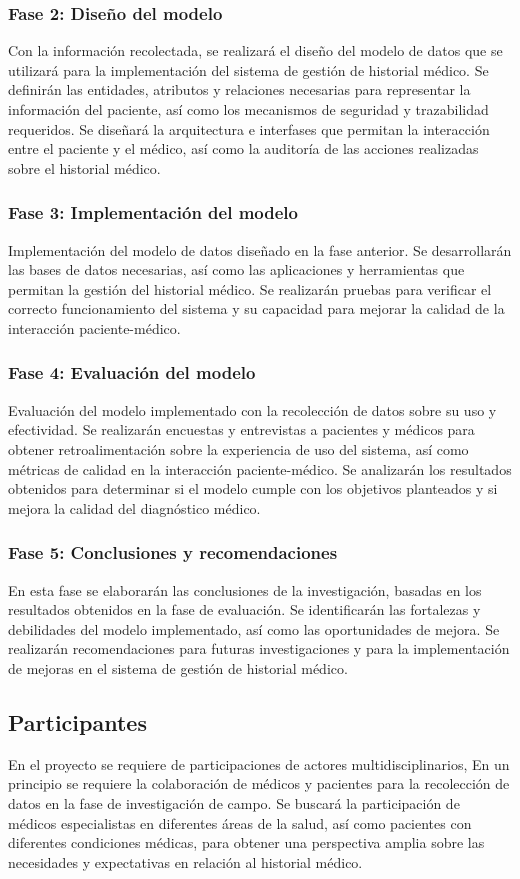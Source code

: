     \subsubsection{Fase 2: Diseño del modelo}
    Con la información recolectada, se realizará el diseño del  modelo de datos que se utilizará para la implementación del sistema de gestión de historial médico. Se definirán las entidades, atributos y relaciones necesarias para representar la información del paciente, así como los mecanismos de seguridad y trazabilidad requeridos. Se diseñará la arquitectura e interfases que permitan la interacción entre el paciente y el médico, así como la auditoría de las acciones realizadas sobre el historial médico.
    \subsubsection{Fase 3: Implementación del modelo}
    Implementación del modelo de datos diseñado en la fase anterior. Se desarrollarán las bases de datos necesarias, así como las aplicaciones y herramientas que permitan la gestión del historial médico. Se realizarán pruebas para verificar el correcto funcionamiento del sistema y su capacidad para mejorar la calidad de la interacción paciente-médico.
    \subsubsection{Fase 4: Evaluación del modelo}
    Evaluación del modelo implementado con la recolección de datos sobre su uso y efectividad. Se realizarán encuestas y entrevistas a pacientes y médicos para obtener retroalimentación sobre la experiencia de uso del sistema, así como métricas de calidad en la interacción paciente-médico. Se analizarán los resultados obtenidos para determinar si el modelo cumple con los objetivos planteados y si mejora la calidad del diagnóstico médico.
    \subsubsection{Fase 5: Conclusiones y recomendaciones}
    En esta fase se elaborarán las conclusiones de la investigación, basadas en los resultados obtenidos en la fase de evaluación. Se identificarán las fortalezas y debilidades del modelo implementado, así como las oportunidades de mejora. Se realizarán recomendaciones para futuras investigaciones y para la implementación de mejoras en el sistema de gestión de historial médico.    
    \subsection{Participantes}
    En el proyecto se requiere de participaciones de actores multidisciplinarios, En un principio se requiere la colaboración de médicos y pacientes para la recolección de datos en la fase de investigación de campo. Se buscará la participación de médicos especialistas en diferentes áreas de la salud, así como pacientes con diferentes condiciones médicas, para obtener una perspectiva amplia sobre las necesidades y expectativas en relación al historial médico.

